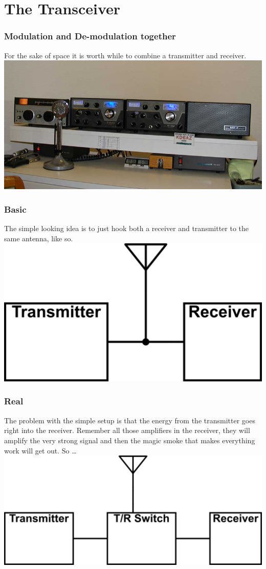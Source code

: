 \documentclass[10pt]{beamer}
\begin{document}
\section{The Transceiver}
\begin{frame}
\frametitle{Modulation and De-modulation together}
For the sake of space it is worth while to combine a transmitter and receiver.
\includegraphics[height=.6\textheight]{drake4.jpg}
\end{frame}

\begin{frame}
\frametitle{Basic}
The simple looking idea is to just hook both a receiver and transmitter to the same antenna, like so.
\includegraphics[height=.5\textheight]{simpletr.png}
\end{frame}

\begin{frame}
\frametitle{Real}
The problem with the simple setup is that the energy from the transmitter goes right into the receiver. Remember all those amplifiers in the receiver, they will amplify the very strong signal and then the magic smoke that makes everything work will get out. So \ldots
\includegraphics[width=.8\textwidth]{simpletrworks.png}
\end{frame}
\end{document}
